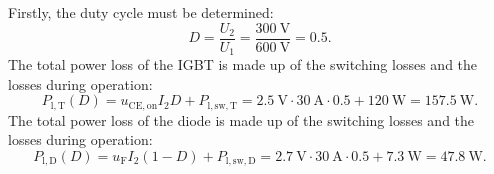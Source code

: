 \begin{solutionblock}
Firstly, the duty cycle must be determined:
\begin{equation}
    D = \frac{U_\mathrm{2}}{U_\mathrm{1}} = \frac{\SI{300}{\volt}}{\SI{600}{\volt}} = 0.5.
\end{equation}
The total power loss of the IGBT is made up of the switching losses and the losses during operation:
\begin{equation}
    P_{\mathrm{l,T}}(D) = u_{\mathrm{CE,on}} I_\mathrm{2} D +  P_{\mathrm{l,sw,T}} = \SI{2.5}{\volt} \cdot \SI{30}{\ampere} \cdot 0.5 + \SI{120}{\watt} = \SI{157.5}{\watt}.
\end{equation}
The total power loss of the diode is made up of the switching losses and the losses during operation:
\begin{equation}
    P_{\mathrm{l,D}}(D) = u_{\mathrm{F}} I_\mathrm{2} (1-D) +  P_{\mathrm{l,sw,D}} = \SI{2.7}{\volt} \cdot \SI{30}{\ampere} \cdot 0.5 + \SI{7.3}{\watt} = \SI{47.8}{\watt}.
\end{equation}
\end{solutionblock}

    